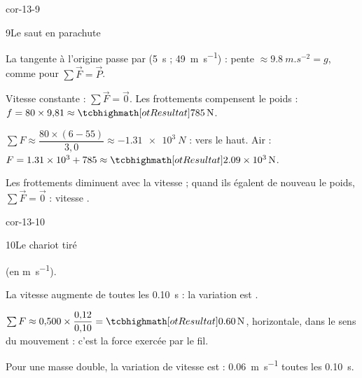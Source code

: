 \begin{blocLivre}{cor-13-9}
\begin{corrige}{9}{Le saut en parachute}
\begin{questions}
\item La tangente à l'origine passe par (\qty{5}{s} ; \qty{49}{m.s^{-1}}) : pente $\approx\qty{9,8}{m.s^{-2}}=g$, comme pour $\sum\vec{F}=\vec{P}$.
\item Vitesse constante : $\sum\vec{F}=\vec{0}$. Les frottements compensent le poids : $f=80\times9{,}81\approx\res{\qty{785}{N}}$.
\item $\sum F\approx\dfrac{80\times(6-55)}{3{,}0}\approx-\qty{1,31e3}{N}$ : vers le haut. Air : $F=\num{1,31e3}+785\approx\res{\qty{2,09e3}{N}}$.
\item Les frottements diminuent avec la vitesse ; quand ils égalent de nouveau le poids, $\sum\vec{F}=\vec{0}$ : vitesse .
\end{questions}
\end{corrige}
\end{blocLivre}
\begin{blocLivre}{cor-13-10}
\begin{corrige}{10}{Le chariot tiré}
\begin{questions}
\item {} (en \unit{m.s^{-1}}).
\item La vitesse augmente de  toutes les \qty{0,10}{s} : la variation est .
\item $\sum F\approx0{,}500\times\dfrac{0{,}12}{0{,}10}=\res{\qty{0,60}{N}}$, horizontale, dans le sens du mouvement : c'est la force exercée par le fil.
\item Pour une masse double, la variation de vitesse est  : \qty{0,06}{m.s^{-1}} toutes les \qty{0,10}{s}.
\end{questions}
\end{corrige}
\end{blocLivre}
